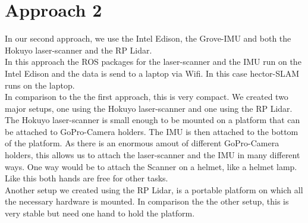 \documentclass{sigchi-ext}
\begin{document}
\section{Approach 2}
In our second approach, we use the Intel Edison, the Grove-IMU and both the Hokuyo laser-scanner and the RP Lidar.\\
In this approach the ROS packages for the laser-scanner and the IMU run on the Intel Edison and the data is send to a laptop via Wifi. In this case hector-SLAM runs on the laptop.\\
In comparison to the the first approach, this is very compact.
We created two major setups, one using the Hokuyo laser-scanner and one using the RP Lidar. The Hokuyo laser-scanner is small enough to be mounted on a platform that can be attached to GoPro-Camera holders. The IMU is then attached to the bottom of the platform. As there is an enormous amout of different GoPro-Camera holders, this allows us to attach the laser-scanner and the IMU in many different ways. One way would be to attach the Scanner on a helmet, like a helmet lamp. Like this both hands are free for other tasks.\\
Another setup we created using the RP Lidar, is a portable platform on which all the necessary hardware is mounted. In comparison the the other setup, this is very stable but need one hand to hold the platform.\\
\end{document}
